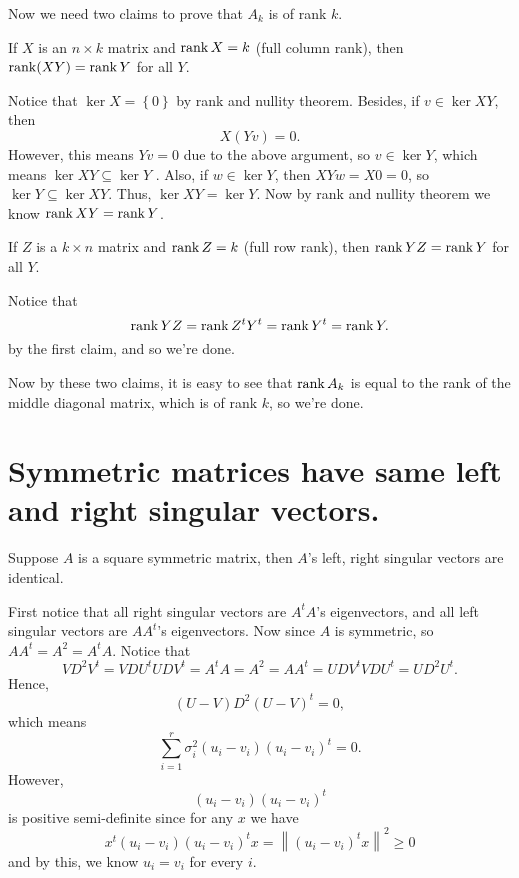 \begin{explanation}
Now we need two claims to prove that \(A_k\) is of rank \(k\). 

\begin{claim}
	If \(X\) is an \(n \times k\) matrix and \(\rank  X = k\) (full column rank), then \(\rank (XY)= \rank Y\) for all \(Y\).     
\end{claim}
\begin{explanation}
	Notice that \(\ker X = \left\{ 0 \right\} \) by rank and nullity theorem. Besides, if \(v \in \ker XY\), then 
	\[
		X(Yv) = 0.
	\] However, this means \(Yv=0\) due to the above argument, so \(v \in \ker  Y\), which means \(\ker  XY \subseteq \ker  Y\) . Also, if \(w \in \ker  Y\), then \(XYw=X0=0\), so \(\ker Y \subseteq \ker XY\). Thus, \(\ker XY=\ker Y\). Now by rank and nullity theorem we know \(\rank XY = \rank Y\).       
\end{explanation}

\begin{claim}
	If \(Z\) is a \(k \times n\) matrix and \(\rank Z = k\) (full row rank), then \(\rank YZ = \rank Y\) for all \(Y\).      
\end{claim}
\begin{explanation}
Notice that 
\[
	\rank YZ = \rank Z^{t} Y^t = \rank Y^t = \rank Y.
\]
by the first claim, and so we're done.
\end{explanation}

Now by these two claims, it is easy to see that \(\rank A_k\) is equal to the rank of the middle diagonal matrix, which is of rank \(k\), so we're done.  
\end{explanation}

\section{Symmetric matrices have same left and right singular vectors.} \label{appendix: sym matrix same l,r SV}

\begin{claim}
  Suppose \(A\) is a square symmetric matrix, then \(A\)'s left, right singular vectors are identical. 
\end{claim}
\begin{explanation}
  First notice that all right singular vectors are \(A^t A\)'s eigenvectors, and all left singular vectors are \(A A^t\)'s eigenvectors. Now since \(A\) is symmetric, so \(A A^t = A^2 = A^t A\). Notice that 
  \[
    V D^2 V^t = V D U^t U D V^t = A^t A = A^2 = A A^t = UDV^t VD U^t = U D^2 U^t.
  \]  
  Hence, 
  \[
    (U-V) D^2 (U-V)^t = 0,
  \]    
  which means 
  \[
    \sum_{i=1}^{r} \sigma _i^2 (u_i - v_i)(u_i - v_i)^t = 0. 
  \]
  However, 
  \[
   (u_i - v_i)(u_i - v_i)^t 
  \]
  is positive semi-definite since for any \(x\) we have 
  \[
    x^t (u_i - v_i)(u_i - v_i)^t x = \left\lVert (u_i - v_i)^t x \right\rVert ^2 \ge 0
  \] 
  and by this, we know \(u_i = v_i\) for every \(i\).  
\end{explanation}

